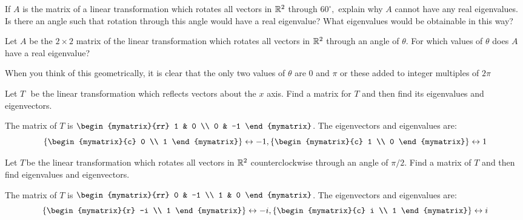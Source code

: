 \begin{enumialphparenastyle}

\begin{ex} If $A$ is the matrix of a linear transformation which rotates all
vectors in $\mathbb{R}^{2}$ through $60^{\circ },$ explain why $A$ cannot
have any real eigenvalues. Is there an angle such that rotation through this
angle would have a real eigenvalue? What eigenvalues would be obtainable in
this way? \vspace{1mm} 
\end{ex}


\begin{ex} Let $A$ be the $2\times 2$ matrix of the linear transformation which
rotates all vectors in $\mathbb{R}^{2}$ through an angle of $\theta $. For
which values of $\theta $ does $A$ have a real eigenvalue? 
\begin{sol}
When you think of this geometrically, it is clear that the only two values
of $\theta $ are 0 and $\pi $ or these added to integer multiples of $2\pi $
\end{sol}
\end{ex}


\begin{ex} Let $T\,$\ be the linear transformation which reflects vectors about
the $x$ axis. Find a matrix for $T$ and then find its eigenvalues and
eigenvectors. 
\begin{sol}
The matrix of $T$ is $\begin{mymatrix}{rr}
1 & 0 \\
0 & -1
\end{mymatrix}$. The eigenvectors and eigenvalues are:
\[
\set{\begin{mymatrix}{c}
0 \\
1
\end{mymatrix} } \leftrightarrow -1,\set{\begin{mymatrix}{c}
1 \\
0
\end{mymatrix} } \leftrightarrow 1
\]
\end{sol}
\end{ex}

\begin{ex} Let $T\,$be the linear transformation which rotates all vectors in 
$\mathbb{R}^{2}$ counterclockwise through an angle of $\pi /2.$ Find a matrix
of $T$ and then find eigenvalues and eigenvectors.
\begin{sol}
The matrix of $T$ is $\begin{mymatrix}{rr}
0 & -1 \\
1 & 0
\end{mymatrix}$. The eigenvectors and eigenvalues are:
\[
\set{\begin{mymatrix}{r}
-i \\
1
\end{mymatrix} } \leftrightarrow -i,\set{\begin{mymatrix}{c}
i \\
1
\end{mymatrix} } \leftrightarrow i
\]
\end{sol}
\end{ex}


\end{enumialphparenastyle}
